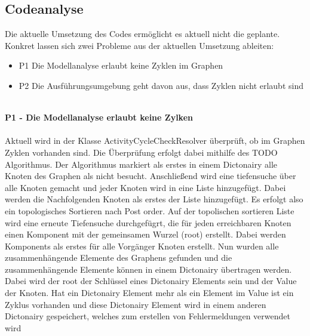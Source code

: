 \documentclass{article}
\begin{document}
    \subsection{Codeanalyse}
        Die aktuelle Umsetzung des Codes ermöglicht es aktuell nicht die geplante. Konkret lassen sich zwei Probleme aus der aktuellen Umsetzung ableiten:
        \begin{itemize}
            \item P1 Die Modellanalyse erlaubt keine Zyklen im Graphen
            \item P2 Die Ausführungsumgebung geht davon aus, dass Zyklen nicht erlaubt sind
        \end{itemize}\\
        \textbf{P1 - Die Modellanalyse erlaubt keine Zylken}\\
        \\
        Aktuell wird in der Klasse ActivityCycleCheckResolver überprüft, ob im Graphen Zyklen vorhanden sind. Die Überprüfung erfolgt dabei mithilfe des TODO Algorithmus.
        Der Algorithmus markiert als erstes in einem Dictonairy alle Knoten des Graphen als nicht besucht. 
        Anschließend wird eine tiefensuche über alle Knoten gemacht und jeder Knoten wird in eine Liste hinzugefügt. Dabei werden die Nachfolgenden Knoten als erstes der Liste hinzugefügt. Es erfolgt also ein topologisches Sortieren nach Post order.
        Auf der topolischen sortieren Liste wird eine erneute Tiefensuche durchgefügrt, die für jeden erreichbaren Knoten einen Komponent mit der gemeinsamen Wurzel (root) erstellt. Dabei werden Komponents als erstes für alle Vorgänger Knoten erstellt.
        Nun wurden alle zusammenhängende Elemente des Graphens gefunden und die zusammenhängende Elemente können in einem Dictonairy übertragen werden. Dabei wird der root der Schlüssel eines Dictonairy Elements sein und der Value der Knoten. 
        Hat ein Dictonairy Element mehr als ein Element im Value ist ein Zyklus vorhanden und diese Dictonairy Element wird in einem anderen Dictonairy gespeichert, welches zum erstellen von Fehlermeldungen verwendet wird\\
\end{document}
